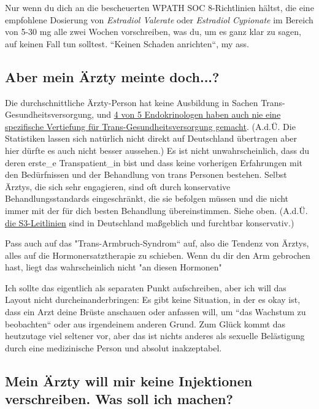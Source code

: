 \documentclass{article}
\begin{document}
																														

Nur wenn du dich an die bescheuerten WPATH SOC 8-Richtlinien hältst, die eine empfohlene Dosierung von \textit{Estradiol Valerate} oder \textit{Estradiol Cypionate} im Bereich von 5-30 mg alle zwei Wochen vorschreiben, was du, um es ganz klar zu sagen, auf keinen Fall tun solltest. “Keinen Schaden anrichten“, my ass.

\subsection{Aber mein Ärzty meinte doch...?}

Die durchschnittliche Ärzty-Person hat keine Ausbildung in Sachen Trans-Gesundheitsversorgung, und \href{https://www.endocrine.org/news-and-advocacy/news-room/2017/endocrinologists-want-training-in-transgender-care }{4 von 5 Endokrinologen haben auch nie eine spezifische Vertiefung für Trans-Gesundheitsversorgung gemacht}. (A.d.Ü. Die Statistiken lassen sich natürlich nicht direkt auf Deutschland übertragen aber hier dürfte es auch nicht besser aussehen.) Es ist nicht unwahrscheinlich, dass du deren erste\_e Transpatient\_in bist und dass keine vorherigen Erfahrungen mit den Bedürfnissen und der Behandlung von trans Personen bestehen. Selbst Ärztys, die sich sehr engagieren, sind oft durch konservative Behandlungsstandards eingeschränkt, die sie befolgen müssen und die nicht immer mit der für dich besten Behandlung übereinstimmen. Siehe oben. (A.d.Ü. \href{https://schwulenberatungberlin.de/wp-content/uploads/2025/06/AWMF-online_S3_Richtlinie.pdf}{die S3-Leitlinien} sind in Deutschland maßgeblich und furchtbar konservativ.)

Pass auch auf das "Trans-Armbruch-Syndrom“ auf, also die Tendenz von Ärztys, alles auf die Hormonersatztherapie zu schieben. Wenn du dir den Arm gebrochen hast, liegt das wahrscheinlich nicht "an diesen Hormonen"

Ich sollte das eigentlich als separaten Punkt aufschreiben, aber ich will das Layout nicht durcheinanderbringen: Es gibt keine Situation, in der es okay ist, dass ein Arzt deine Brüste anschauen oder anfassen will, um “das Wachstum zu beobachten“ oder aus irgendeinem anderen Grund. Zum Glück kommt das heutzutage viel seltener vor, aber das ist nichts anderes als sexuelle Belästigung durch eine medizinische Person und absolut inakzeptabel.

\subsection{Mein Ärzty will mir keine Injektionen verschreiben. Was soll ich machen?}
\end{document}
